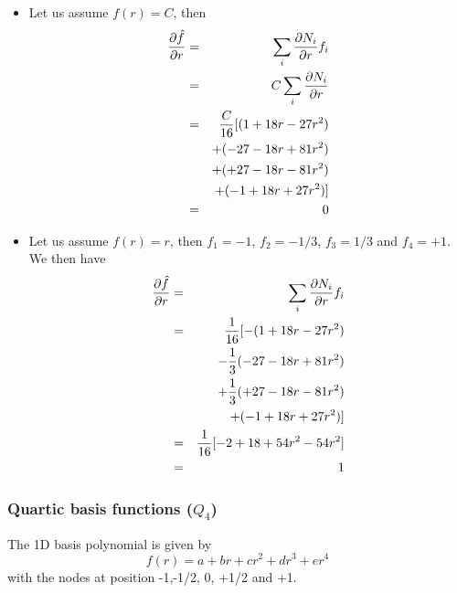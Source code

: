 \begin{itemize}
\item
Let us assume $f(r)=C$, then
\begin{eqnarray}
\frac{\partial \hat{f}}{\partial r} 
&=& \sum_i \frac{\partial N_i}{\partial r} f_i  \nonumber\\
&=&  C \sum_i \frac{\partial N_i}{\partial r}  \nonumber\\
&=& \frac{C}{16} [  (  1 +18r - 27r^2 ) \nonumber\\
&&+ (-27 -18r + 81r^2 )  \nonumber\\
&&+  (+27 -18r - 81r^2 ) \nonumber\\
&&+ ( -1 +18r + 27r^2 ) ]  \nonumber\\
&=& 0 \nonumber
\end{eqnarray}

\item
Let us assume $f(r)= r$, then $f_1=-1$, $f_2=-1/3$, $f_3=1/3$ and $f_4=+1$. We then have
\begin{eqnarray}
\frac{\partial \hat{f}}{\partial r} 
&=& \sum_i \frac{\partial N_i}{\partial r} f_i  \nonumber\\
&=& \frac{1}{16} [  -(  1 +18r - 27r^2 ) \nonumber\\ 
&& -\frac{1}{3} (-27 -18r + 81r^2 )  \nonumber\\
&& +\frac{1}{3}  (+27 -18r - 81r^2 ) \nonumber\\
&& + ( -1 +18r + 27r^2 ) ]  \nonumber\\
&=& \frac{1}{16} [-2 + 18 + 54r^2 - 54r^2] \nonumber\\
&=& 1 \nonumber
\end{eqnarray}

\end{itemize}

\subsubsection{Quartic basis functions ($Q_4$) \label{sec:bf4}}

The 1D basis polynomial is given by
\[
f(r)=a+br+cr^2+dr^3+er^4
\]
with the nodes at position -1,-1/2, 0, +1/2 and +1.

